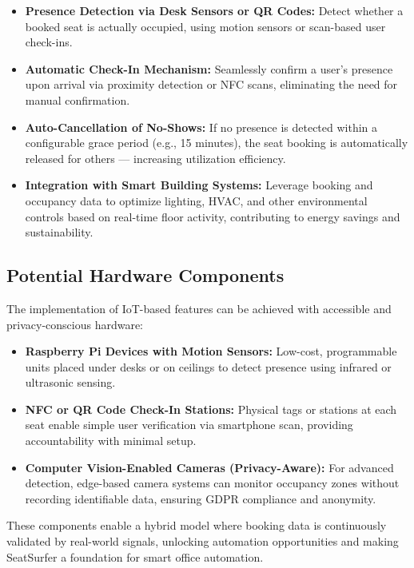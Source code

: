 \documentclass[12pt,a4paper]{report}
\begin{document}
\begin{itemize}
\item \textbf{Presence Detection via Desk Sensors or QR Codes:}
Detect whether a booked seat is actually occupied, using motion sensors or scan-based user check-ins.
\item \textbf{Automatic Check-In Mechanism:}  
Seamlessly confirm a user's presence upon arrival via proximity detection or NFC scans, eliminating the need for manual confirmation.
\item \textbf{Auto-Cancellation of No-Shows:}  
If no presence is detected within a configurable grace period (e.g., 15 minutes), the seat booking is automatically released for others — increasing utilization efficiency.
\item \textbf{Integration with Smart Building Systems:}  
Leverage booking and occupancy data to optimize lighting, HVAC, and other environmental controls based on real-time floor activity, contributing to energy savings and sustainability.
\end{itemize}

\subsection*{Potential Hardware Components}

The implementation of IoT-based features can be achieved with accessible and privacy-conscious hardware:

\begin{itemize}
\item \textbf{Raspberry Pi Devices with Motion Sensors:}
Low-cost, programmable units placed under desks or on ceilings to detect presence using infrared or ultrasonic sensing.
\item \textbf{NFC or QR Code Check-In Stations:}  
Physical tags or stations at each seat enable simple user verification via smartphone scan, providing accountability with minimal setup.
\item \textbf{Computer Vision-Enabled Cameras (Privacy-Aware):}  
For advanced detection, edge-based camera systems can monitor occupancy zones without recording identifiable data, ensuring GDPR compliance and anonymity.
\end{itemize}

These components enable a hybrid model where booking data is continuously validated by real-world signals, unlocking automation opportunities and making SeatSurfer a foundation for smart office automation.
\end{document}
